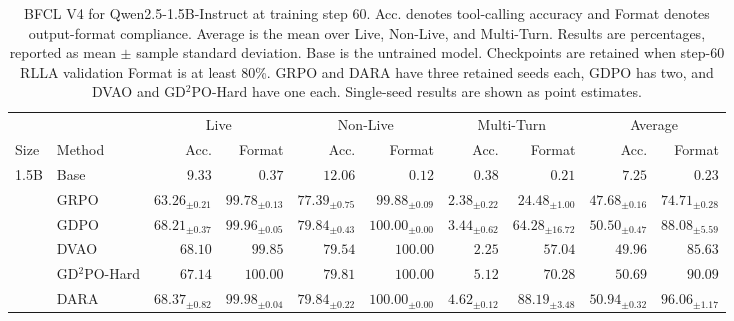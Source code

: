 \begin{table}[t]
\centering
\caption{BFCL V4 for Qwen2.5-1.5B-Instruct at training step 60. Acc. denotes tool-calling accuracy and Format denotes output-format compliance. Average is the mean over Live, Non-Live, and Multi-Turn. Results are percentages, reported as mean $\pm$ sample standard deviation. Base is the untrained model. Checkpoints are retained when step-60 RLLA validation Format is at least 80\%. GRPO and DARA have three retained seeds each, GDPO has two, and DVAO and GD$^2$PO-Hard have one each. Single-seed results are shown as point estimates.}
\label{tab:bfcl-v4-step60}
\setlength{\tabcolsep}{4pt}
\small
\begin{tabular}{llrrrrrrrr}
\toprule
 & & \multicolumn{2}{c}{Live} & \multicolumn{2}{c}{Non-Live} & \multicolumn{2}{c}{Multi-Turn} & \multicolumn{2}{c}{Average} \\
\cmidrule(lr){3-4}\cmidrule(lr){5-6}\cmidrule(lr){7-8}\cmidrule(lr){9-10}
Size & Method & Acc. & Format & Acc. & Format & Acc. & Format & Acc. & Format \\
\midrule
1.5B & Base & $9.33$ & $0.37$ & $12.06$ & $0.12$ & $0.38$ & $0.21$ & $7.25$ & $0.23$ \\
 & GRPO & $63.26_{\pm 0.21}$ & $99.78_{\pm 0.13}$ & $77.39_{\pm 0.75}$ & $99.88_{\pm 0.09}$ & $2.38_{\pm 0.22}$ & $24.48_{\pm 1.00}$ & $47.68_{\pm 0.16}$ & $74.71_{\pm 0.28}$ \\
 & GDPO & $68.21_{\pm 0.37}$ & $99.96_{\pm 0.05}$ & $\mathbf{79.84}_{\pm 0.43}$ & $\mathbf{100.00}_{\pm 0.00}$ & $3.44_{\pm 0.62}$ & $64.28_{\pm 16.72}$ & $50.50_{\pm 0.47}$ & $88.08_{\pm 5.59}$ \\
 & DVAO & $68.10$ & $99.85$ & $79.54$ & $\mathbf{100.00}$ & $2.25$ & $57.04$ & $49.96$ & $85.63$ \\
 & GD$^2$PO-Hard & $67.14$ & $\mathbf{100.00}$ & $79.81$ & $\mathbf{100.00}$ & $\mathbf{5.12}$ & $70.28$ & $50.69$ & $90.09$ \\
 & DARA & $\mathbf{68.37}_{\pm 0.82}$ & $99.98_{\pm 0.04}$ & $\mathbf{79.84}_{\pm 0.22}$ & $\mathbf{100.00}_{\pm 0.00}$ & $4.62_{\pm 0.12}$ & $\mathbf{88.19}_{\pm 3.48}$ & $\mathbf{50.94}_{\pm 0.32}$ & $\mathbf{96.06}_{\pm 1.17}$ \\
\bottomrule
\end{tabular}
\end{table}
